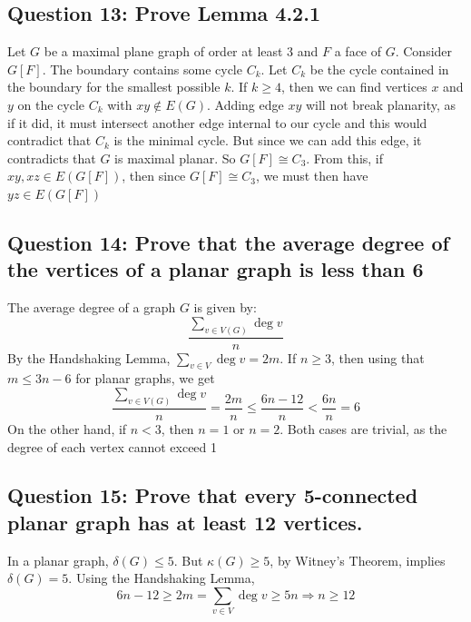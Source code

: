 \documentclass[letterpaper, 11pt]{article}
\newcommand{\1}{\mathds{1}}	%
\theoremstyle{definition}
\begin{document}
\subsection*{Question 13: Prove Lemma 4.2.1}
Let $G$ be a maximal plane graph of order at least 3 and $F$ a face of $G$. Consider $G[F]$. The boundary contains some cycle $C_k$. Let $C_k$ be the cycle contained in the boundary for the smallest possible $k$. If $k \ge 4$, then we can find vertices $x$ and $y$ on the cycle $C_k$ with $xy \notin E(G)$. Adding edge $xy$ will not break planarity, as if it did, it must intersect another edge internal to our cycle and this would contradict that $C_k$ is the minimal cycle. But since we can add this edge, it contradicts that $G$ is maximal planar. So $G[F] \cong C_3$. From this, if $xy, xz \in E(G[F])$, then since $G[F] \cong C_3$, we must then have $yz \in E(G[F])$

\subsection*{Question 14: Prove that the average degree of the vertices of a planar graph is less than 6}
The average degree of a graph $G$ is given by: \[
\frac{\sum \limits _{v \in V(G)}\deg v}{n}
\]
By the Handshaking Lemma, $\sum \limits _{v \in V} \deg v = 2m$. If $n \ge 3$, then using that $m \le 3n - 6$ for planar graphs, we get\[
\frac{\sum \limits _{v \in V(G)}\deg v}{n} = \frac{2m}{n} \le \frac{6n - 12}{n} < \frac{6n}{n} = 6
\]
On the other hand, if $n < 3$, then $n = 1$ or $n=2$. Both cases are trivial, as the degree of each vertex cannot exceed 1

\subsection*{Question 15: Prove that every 5-connected planar graph has at least 12 vertices.}
In a planar graph, $\delta (G) \le 5$. But $\kappa (G) \ge 5$, by Witney's Theorem, implies $\delta (G) = 5$. Using the Handshaking Lemma, \[
6n - 12 \ge 2m = \sum \limits _{v \in V} \deg v \ge 5 n \Rightarrow n \ge 12
\]
\end{document}
